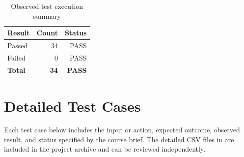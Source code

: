 \documentclass[11pt,a4paper,oneside]{report}
\newcommand{\projectpath}[1]{\path{#1}}
\begin{document}
\begin{table}[htbp]\centering
\caption{Observed test execution summary}
\begin{tabular}{lrr}\toprule
\textbf{Result} & \textbf{Count} & \textbf{Status}\\\midrule
Passed & 34 & PASS\\
Failed & 0 & PASS\\
\textbf{Total} & \textbf{34} & \textbf{PASS}\\
\bottomrule\end{tabular}
\end{table}

\section{Detailed Test Cases}
Each test case below includes the input or action, expected outcome, observed result, and status specified by the course brief. The detailed CSV files in \projectpath{tests/} are included in the project archive and can be reviewed independently.
\small
\setlength{\tabcolsep}{2pt}
\end{document}
